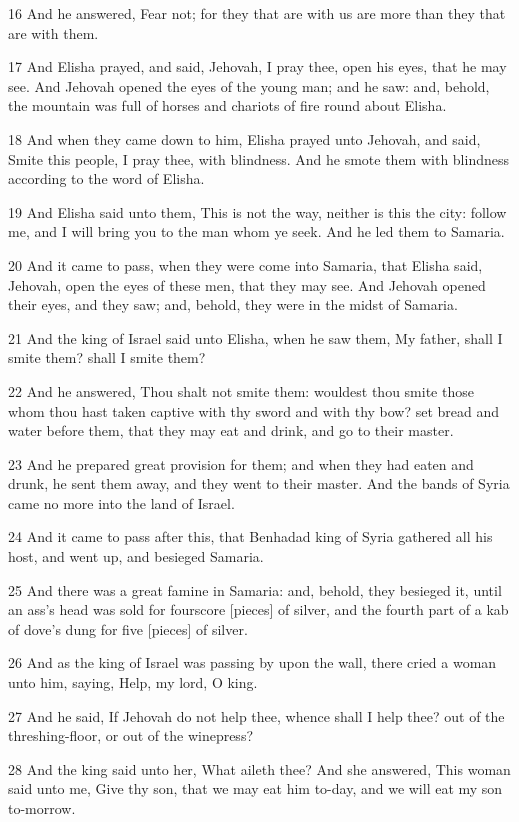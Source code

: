\par 16 And he answered, Fear not; for they that are with us are more than they that are with them.
\par 17 And Elisha prayed, and said, Jehovah, I pray thee, open his eyes, that he may see. And Jehovah opened the eyes of the young man; and he saw: and, behold, the mountain was full of horses and chariots of fire round about Elisha.
\par 18 And when they came down to him, Elisha prayed unto Jehovah, and said, Smite this people, I pray thee, with blindness. And he smote them with blindness according to the word of Elisha.
\par 19 And Elisha said unto them, This is not the way, neither is this the city: follow me, and I will bring you to the man whom ye seek. And he led them to Samaria.
\par 20 And it came to pass, when they were come into Samaria, that Elisha said, Jehovah, open the eyes of these men, that they may see. And Jehovah opened their eyes, and they saw; and, behold, they were in the midst of Samaria.
\par 21 And the king of Israel said unto Elisha, when he saw them, My father, shall I smite them? shall I smite them?
\par 22 And he answered, Thou shalt not smite them: wouldest thou smite those whom thou hast taken captive with thy sword and with thy bow? set bread and water before them, that they may eat and drink, and go to their master.
\par 23 And he prepared great provision for them; and when they had eaten and drunk, he sent them away, and they went to their master. And the bands of Syria came no more into the land of Israel.
\par 24 And it came to pass after this, that Benhadad king of Syria gathered all his host, and went up, and besieged Samaria.
\par 25 And there was a great famine in Samaria: and, behold, they besieged it, until an ass's head was sold for fourscore [pieces] of silver, and the fourth part of a kab of dove's dung for five [pieces] of silver.
\par 26 And as the king of Israel was passing by upon the wall, there cried a woman unto him, saying, Help, my lord, O king.
\par 27 And he said, If Jehovah do not help thee, whence shall I help thee? out of the threshing-floor, or out of the winepress?
\par 28 And the king said unto her, What aileth thee? And she answered, This woman said unto me, Give thy son, that we may eat him to-day, and we will eat my son to-morrow.
